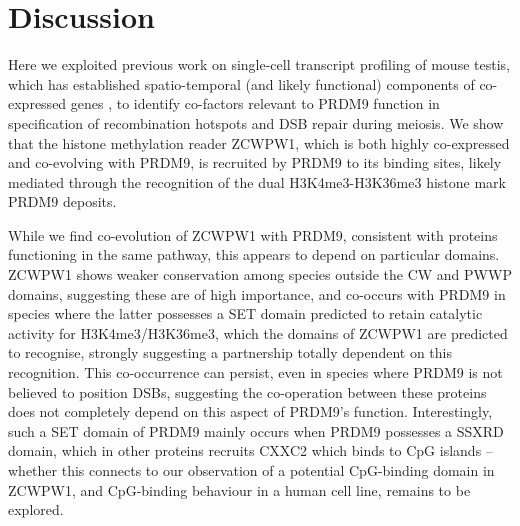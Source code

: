 \section{Discussion}
Here we exploited previous work on single-cell transcript profiling of mouse testis, which has established spatio-temporal (and likely functional) components of co-expressed genes \parencite{Jung2019Unified}, to identify co-factors relevant to PRDM9 function in specification of recombination hotspots and DSB repair during meiosis.
We show that the histone methylation reader ZCWPW1, which is both highly co-expressed and co-evolving with PRDM9, is recruited by PRDM9 to its binding sites, likely mediated through the recognition of the dual H3K4me3-H3K36me3 histone mark PRDM9 deposits.

While we find co-evolution of ZCWPW1 with PRDM9, consistent with proteins functioning in the same pathway, this appears to depend on particular domains.
ZCWPW1 shows weaker conservation among species outside the CW and PWWP domains, suggesting these are of high importance, and co-occurs with PRDM9 in species where the latter possesses a SET domain predicted to retain catalytic activity for H3K4me3/H3K36me3, which the domains of ZCWPW1 are predicted to recognise, strongly suggesting a partnership totally dependent on this recognition.
This co-occurrence can persist, even in species where PRDM9 is not believed to position DSBs, suggesting the co-operation between these proteins does not completely depend on this aspect of PRDM9’s function.
Interestingly, such a SET domain of PRDM9 mainly occurs when PRDM9 possesses a SSXRD domain, which in other proteins \parencite{Banito2018SS18SSX} recruits CXXC2 which binds to CpG islands – whether this connects to our observation of a potential CpG-binding domain in ZCWPW1, and CpG-binding behaviour in a human cell line, remains to be explored.

